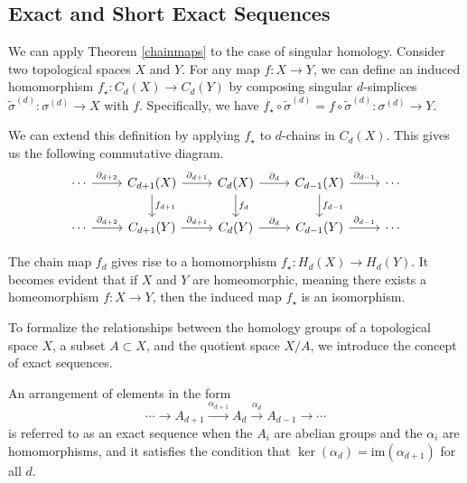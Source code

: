\subsection{Exact and Short Exact Sequences}
\label{Exact and Short Exact Sequences}
We can apply Theorem \ref{chainmaps} to the case of singular homology. Consider two topological spaces $X$ and $Y$. For any map $f: X \rightarrow Y$, we can define an induced homomorphism $f_\star: C_d(X) \rightarrow C_d(Y)$ by composing singular $d$-simplices $\tilde{\sigma}^{(d)}: \sigma^{(d)} \rightarrow X$ with $f$. Specifically, we have $f_\star \circ \tilde{\sigma}^{(d)} = f \circ \tilde{\sigma}^{(d)}: \sigma^{(d)} \rightarrow Y$.

We can extend this definition by applying $f_\star$ to $d$-chains in $C_d(X)$. This gives us the following commutative diagram.
\begin{equation}
\begin{tikzcd}
\cdots \arrow[r, "\partial_{d+2}"] & C_{d+1}(X) \arrow[r, "\partial_{d+1}"] \arrow[d, "f_{d+1}"] & C_d(X) \arrow[r, "\partial_d"] \arrow[d, "f_d"] & C_{d-1}(X) \arrow[r, "\partial_{d-1}"] \arrow[d, "f_{d-1}"] & \cdots \\
\cdots \arrow[r, "\partial_{d+2}"] & C_{d+1}(Y) \arrow[r, "\partial_{d+1}"]                                  & C_d(Y) \arrow[r, "\partial_d"]                              & C_{d-1}(Y) \arrow[r, "\partial_{d-1}"]                                  & \cdots
\end{tikzcd}
\end{equation}

The chain map $f_d$ gives rise to a homomorphism $f_\star: H_d(X) \rightarrow H_d(Y)$. It becomes evident that if $X$ and $Y$ are homeomorphic, meaning there exists a homeomorphism $f: X \rightarrow Y$, then the induced map $f_\star$ is an isomorphism.

To formalize the relationships between the homology groups of a topological space $X$, a subset $A \subset X$, and the quotient space $X/A$, we introduce the concept of exact sequences.

\begin{definition}
An arrangement of elements in the form
\begin{equation}
\cdots \rightarrow A_{d+1} \xrightarrow{\alpha_{d+1}} A_{d} \xrightarrow{\alpha_d} A_{d-1} \xrightarrow{} \cdots
\end{equation}
is referred to as an exact sequence when the $A_i$ are abelian groups and the $\alpha_i$ are homomorphisms, and it satisfies the condition that $\ker(\alpha_d) = \mathrm{im}(\alpha_{d+1})$ for all $d$.
\end{definition}

